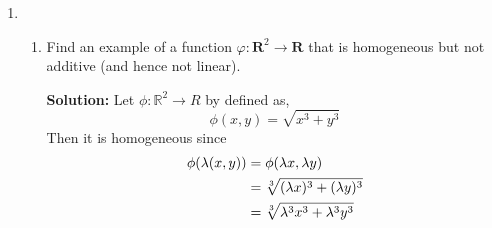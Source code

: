 \documentclass[12pt]{article}
\newcommand{\R}{\mathbb{R}}
\newcommand{\pars}[1]{\left( {#1} \right) }
\begin{document}
\begin{enumerate}
\begin{proof}
    Simplifying for
    $$c = 2c$$
    Implies that $c = 0$ to preserve linearity.\\\\
    Therefore, in order for addition to be linear, $a = b = c = 0$. It suffices to show just addition since it restricts all 3 variables to one value.
    \end{proof}
    \begin{proof} ($\Longleftarrow$) If $a=b=c=0$ then $T$ is linear.
    That means that
    $$Tp = \left( 2p(5)-5p'(1)\,,\,\int_1^4 x^2p(x)\,dx\,,\, p(2)\right).$$
    It has been shown in the forward direction that this holds for additivity when \\$a = b = c = 0$. Thus, we only need to show the remaining property of homogeneity.
    \begin{align}
        T(\lambda p) &= \left( 2\lambda p(5)-5\lambda p'(1)\,,\,\int_1^4 x^2\lambda p(x)\,dx\,,\, \lambda p(2)\right) \notag\\
        &= \left( 2\lambda p(5)-5\lambda p'(1)\,,\,\lambda\int_1^4 x^2 p(x)\,dx\,,\, \lambda p(2)\right) \notag
    \end{align}
    \begin{align}
        \lambda \pars{ Tp } &= \lambda \pars{ 2p(5) - 5p'(1)\,,\,\int_1^4 x^2p(x)\,dx\,,\,p(2) } \notag \\
        &=  \pars{ 2\lambda p(5) - 5\lambda p'(1)\,,\,\lambda \int_1^4 x^2p(x)\,dx\,,\,\lambda p(2) } \notag
    \end{align}
    Hence, $T(\lambda p) = \lambda(Tp)$ and therefore $T$ is linear by definition.
    \end{proof}
    It has been shown that $T$ is linear if and only if $a = b = c = 0$
    \newpage
\item \begin{enumerate}
        \item Find an example of a function $\varphi : \mathbf{R}^2 \to \mathbf{R}$ that is homogeneous but not additive (and hence not linear).
        \begin{mybox}
        \textbf{Solution: } Let $\phi : \R^2 \to R$ by defined as,
        $$\phi(x,y) = \sqrt{x^3 + y^3}$$
        Then it is homogeneous since
        \begin{align}
            \phi(\lambda(x,y) ) &= \phi(\lambda x, \lambda y) \notag\\
            &= \sqrt[3]{(\lambda x)^3 + (\lambda y)^3} \notag\\
            &= \sqrt[3]{\lambda^3 x^3 + \lambda^3 y^3} \notag\\

\end{align}
\end{mybox}
\end{enumerate}
\end{enumerate}
\end{document}
